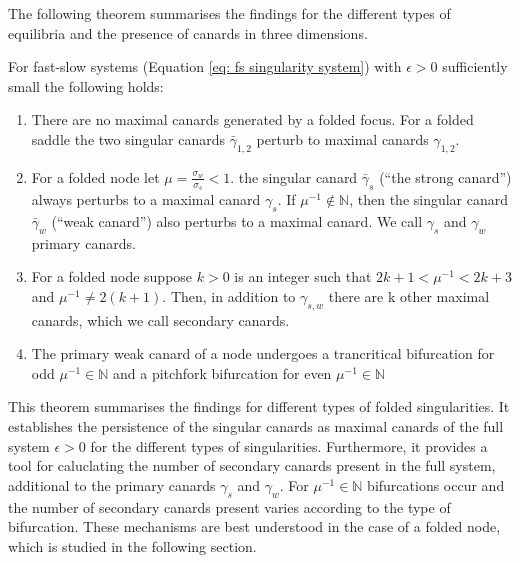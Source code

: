 The following theorem summarises the findings for the different types of equilibria and the presence of canards in three dimensions.
\begin{theorem}\label{thm: canards in R3}
	For fast-slow systems (Equation \ref{eq: fs singularity system}) with $ \epsilon>0 $ sufficiently small the following holds:
\begin{enumerate}
\item  There are no maximal canards generated by a folded focus. For a folded saddle the two singular canards $ \bar{\gamma}_{1,2} $ perturb to maximal canards $ \gamma_{1,2} $.
\item  For a folded node let $\mu=\frac{\sigma_w}{\sigma_s} <1$. the singular canard $ \bar{\gamma}_{s} $ (``the strong canard'') always perturbs to a maximal canard $ \gamma_{s} $. If $ \mu^{-1}\not \in \mathbb{N} $, then the singular canard $ \bar{\gamma}_{w} $ (``weak canard'') also perturbs to a maximal canard. We call $ \gamma_{s} $ and $ \gamma_{w} $ primary canards.
\item For a folded node suppose $ k>0 $ is an integer such that $ 2k+1<\mu^{-1} <2k+3$ and $ \mu^{-1}\neq 2(k+1) $. Then, in addition to $ \gamma_{s,w} $ there are k other maximal canards, which we call secondary canards.
\item The primary weak canard of a node undergoes a trancritical bifurcation for odd $ \mu^{-1}\in\mathbb{N} $ and a pitchfork bifurcation for even $ \mu^{-1}\in\mathbb{N} $
\end{enumerate}
\end{theorem}
This theorem summarises the findings for different types of folded singularities. It establishes the persistence of the singular canards as maximal canards of the full system $\epsilon >0$ for the different types of singularities. Furthermore, it provides a tool for caluclating the number of secondary canards present in the full system, additional to the primary canards $\gamma_s$ and $\gamma_w$.
For $ \mu^{-1}\in\mathbb{N} $ bifurcations occur and the number of secondary canards present varies according to the type of bifurcation.
These mechanisms are best understood in the case of a folded node, which is studied in the following section.


